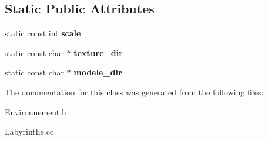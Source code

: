 \subsection*{Static Public Attributes}
\begin{DoxyCompactItemize}
\item 
\mbox{\label{classEnvironnement_ab4246782b933af447e3cb2692180dafe}} 
static const int {\bfseries scale}
\item 
\mbox{\label{classEnvironnement_a70c437280e85144533da98532bd8e910}} 
static const char $\ast$ {\bfseries texture\+\_\+dir}
\item 
\mbox{\label{classEnvironnement_a8296fdb8c70e56b61adbefac0630cc97}} 
static const char $\ast$ {\bfseries modele\+\_\+dir}
\end{DoxyCompactItemize}


The documentation for this class was generated from the following files\+:\begin{DoxyCompactItemize}
\item 
Environnement.\+h\item 
Labyrinthe.\+cc\end{DoxyCompactItemize}
